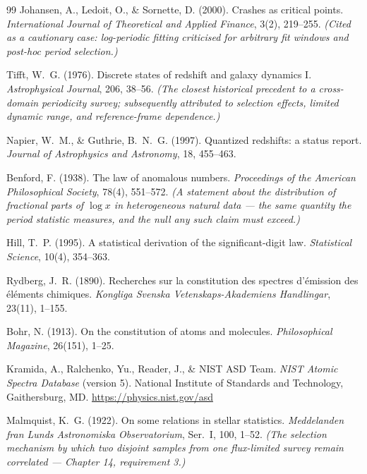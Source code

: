 \documentclass[11pt, letterpaper, openany]{book}
\begin{document}
\begin{thebibliography}{99}
Johansen, A., Ledoit, O., \& Sornette, D. (2000).
Crashes as critical points.
\textit{International Journal of Theoretical and Applied Finance}, 3(2), 219--255.
\textit{(Cited as a cautionary case: log-periodic fitting criticised for arbitrary
fit windows and post-hoc period selection.)}


Tifft, W.~G. (1976).
Discrete states of redshift and galaxy dynamics I.
\textit{Astrophysical Journal}, 206, 38--56.
\textit{(The closest historical precedent to a cross-domain periodicity survey;
subsequently attributed to selection effects, limited dynamic range, and
reference-frame dependence.)}

Napier, W.~M., \& Guthrie, B.~N.~G. (1997).
Quantized redshifts: a status report.
\textit{Journal of Astrophysics and Astronomy}, 18, 455--463.

Benford, F. (1938).
The law of anomalous numbers.
\textit{Proceedings of the American Philosophical Society}, 78(4), 551--572.
\textit{(A statement about the distribution of fractional parts of $\log x$ in
heterogeneous natural data --- the same quantity the period statistic measures,
and the null any such claim must exceed.)}

Hill, T.~P. (1995).
A statistical derivation of the significant-digit law.
\textit{Statistical Science}, 10(4), 354--363.


Rydberg, J.~R. (1890).
Recherches sur la constitution des spectres d'\'emission des \'el\'ements chimiques.
\textit{Kongliga Svenska Vetenskaps-Akademiens Handlingar}, 23(11), 1--155.

Bohr, N. (1913).
On the constitution of atoms and molecules.
\textit{Philosophical Magazine}, 26(151), 1--25.

Kramida, A., Ralchenko, Yu., Reader, J., \& NIST ASD Team.
\textit{NIST Atomic Spectra Database} (version 5). National Institute of Standards
and Technology, Gaithersburg, MD. \url{https://physics.nist.gov/asd}


Malmquist, K.~G. (1922).
On some relations in stellar statistics.
\textit{Meddelanden fran Lunds Astronomiska Observatorium}, Ser.~I, 100, 1--52.
\textit{(The selection mechanism by which two disjoint samples from one
flux-limited survey remain correlated --- Chapter 14, requirement 3.)}


\end{thebibliography}
\end{document}
